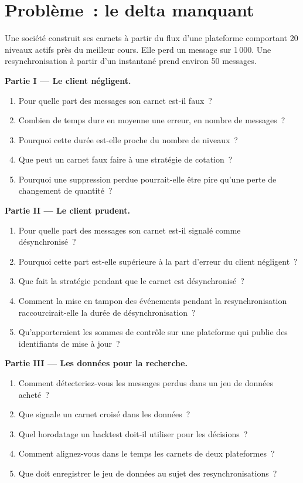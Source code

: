 \section{Problème~: le delta manquant}

\begin{problem}\label{pb:m3:crypto-data-and-infrastructure:1}
Une société construit ses carnets à partir du flux d'une plateforme comportant 20 niveaux actifs près du meilleur cours. Elle perd un message sur 1\,000. Une resynchronisation à partir d'un instantané prend environ 50
messages.

\medskip\noindent\textbf{Partie I --- Le client négligent.}
\begin{enumerate}
\item Pour quelle part des messages son carnet est-il faux~?
\item Combien de temps dure en moyenne une erreur, en nombre de messages~?
\item Pourquoi cette durée est-elle proche du nombre de niveaux~?
\item Que peut un carnet faux faire à une stratégie de cotation~?
\item Pourquoi une suppression perdue pourrait-elle être pire qu'une perte de changement de quantité~?
\end{enumerate}

\medskip\noindent\textbf{Partie II --- Le client prudent.}
\begin{enumerate}[resume]
\item Pour quelle part des messages son carnet est-il signalé comme désynchronisé~?
\item Pourquoi cette part est-elle supérieure à la part d'erreur du client négligent~?
\item Que fait la stratégie pendant que le carnet est désynchronisé~?
\item Comment la mise en tampon des événements pendant la resynchronisation raccourcirait-elle la durée de désynchronisation~?
\item Qu'apporteraient les sommes de contrôle sur une plateforme qui publie des identifiants de mise à jour~?
\end{enumerate}

\medskip\noindent\textbf{Partie III --- Les données pour la recherche.}
\begin{enumerate}[resume]
\item Comment détecteriez-vous les messages perdus dans un jeu de données acheté~?
\item Que signale un carnet croisé dans les données~?
\item Quel horodatage un backtest doit-il utiliser pour les décisions~?
\item Comment alignez-vous dans le temps les carnets de deux plateformes~?
\item Que doit enregistrer le jeu de données au sujet des resynchronisations~?
\end{enumerate}


\end{problem}
